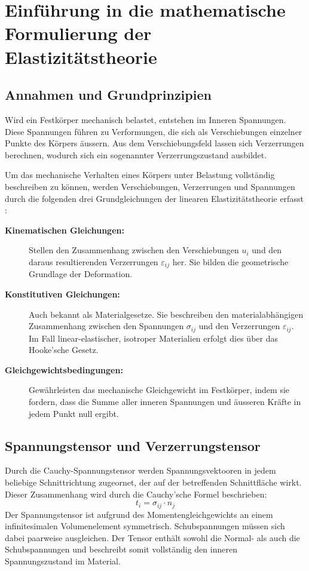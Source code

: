 %
%
%
%
\section{Einführung in die mathematische Formulierung der Elastizitätstheorie}
\label{elastomechanik:section:teil2}
\subsection{Annahmen und Grundprinzipien}
Wird ein Festkörper mechanisch belastet, entstehen im Inneren Spannungen. Diese Spannungen führen zu Verformungen, die sich als Verschiebungen einzelner Punkte des Körpers äussern.
Aus dem Verschiebungsfeld lassen sich Verzerrungen berechnen, wodurch sich ein sogenannter Verzerrungszustand ausbildet.

Um das mechanische Verhalten eines Körpers unter Belastung vollständig beschreiben zu können, werden Verschiebungen, Verzerrungen und Spannungen durch die folgenden drei Grundgleichungen der linearen Elastizitätstheorie erfasst \cite{elastomechanik:Technische_Mechanik_2:Elastostatik}:

\begin{description}
	\item [\textbf{Kinematischen Gleichungen:}] Stellen den Zusammenhang zwischen den Verschiebungen $u_i$ und den daraus resultierenden Verzerrungen $\varepsilon_{ij}$ her. 
	Sie bilden die geometrische Grundlage der Deformation.
	
	\item [\textbf{Konstitutiven Gleichungen:}] Auch bekannt als Materialgesetze. 
	Sie beschreiben den materialabhängigen Zusammenhang zwischen den Spannungen $\sigma_{ij}$ und den Verzerrungen $\varepsilon_{ij}$. 
	Im Fall linear-elastischer, isotroper Materialien erfolgt dies über das Hooke’sche Gesetz.
	
	\item [\textbf{Gleichgewichtsbedingungen:}] Gewährleisten das mechanische Gleichgewicht im Festkörper, indem sie fordern, dass die Summe aller inneren Spannungen und äusseren Kräfte in jedem Punkt null ergibt.
\end{description}

\subsection{Spannungstensor und Verzerrungstensor}
Durch die Cauchy-Spannungstensor werden Spannungsvektooren in jedem beliebige Schnittrichtung zugeornet, der auf der betreffenden Schnittfläche wirkt.
Dieser Zusammenhang wird durch die Cauchy’sche Formel beschrieben:
	\begin{equation}
		t_i = 
		\sigma_{ij} \cdot n_j
	\end{equation}
Der Spannungstensor ist aufgrund des Momentengleichgewichts an einem infinitesimalen Volumenelement symmetrisch. Schubspannungen müssen sich dabei paarweise ausgleichen. 
Der Tensor enthält sowohl die Normal- als auch die Schubspannungen und beschreibt somit vollständig den inneren Spannungszustand im Material.

